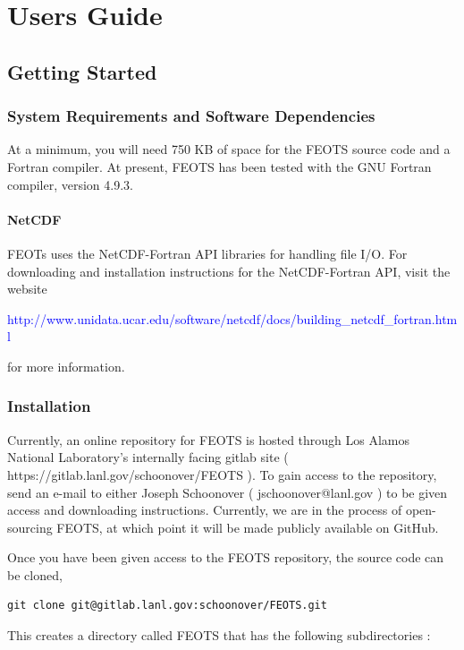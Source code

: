 \documentclass{softwaremanual}
\begin{document}
\pagebreak

{\selectfont
\tableofcontents*
}
\mainmatter

\pagestyle{myheadings}
\part{Users Guide}
\chapter{Getting Started}

\section{System Requirements and Software Dependencies}
At a minimum, you will need 750 KB of space for the FEOTS source code and a Fortran compiler. At present, FEOTS has been tested with the GNU Fortran compiler, version 4.9.3.

\subsection{NetCDF}
 FEOTs uses the NetCDF-Fortran API libraries for handling file I/O. For downloading and installation instructions for the NetCDF-Fortran API, visit the website
 \begin{center}
 \textcolor{blue}{http://www.unidata.ucar.edu/software/netcdf/docs/building\_netcdf\_fortran.html}
 \end{center}
for more information.
  
\section{Installation}
  Currently, an online repository for FEOTS is hosted through Los Alamos National Laboratory's internally facing gitlab site ( https://gitlab.lanl.gov/schoonover/FEOTS ). To gain access to the repository, send an e-mail to either Joseph Schoonover ( jschoonover@lanl.gov ) to be given access and downloading instructions. Currently, we are in the process of open-sourcing FEOTS, at which point it will be made publicly available on GitHub.
  
Once you have been given access to the FEOTS repository, the source code can be cloned,
\begin{verbatim}
git clone git@gitlab.lanl.gov:schoonover/FEOTS.git
\end{verbatim}
This creates a directory called FEOTS that has the following subdirectories :
\end{document}
